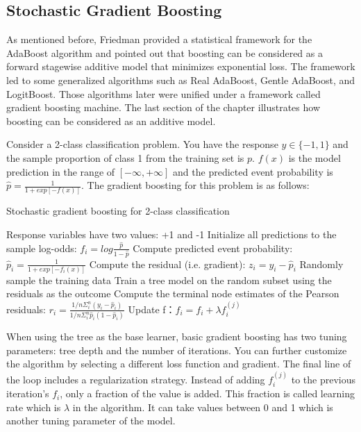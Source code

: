 \documentclass[12pt,]{krantz}
\begin{document}
\hypertarget{stochastic-gradient-boosting}{%
\subsection{Stochastic Gradient Boosting}\label{stochastic-gradient-boosting}}

As mentioned before, Friedman \citep{Friedman2000} provided a statistical framework for the AdaBoost algorithm and pointed out that boosting can be considered as a forward stagewise additive model that minimizes exponential loss. The framework led to some generalized algorithms such as Real AdaBoost, Gentle AdaBoost, and LogitBoost. Those algorithms later were unified under a framework called gradient boosting machine. The last section of the chapter illustrates how boosting can be considered as an additive model.

Consider a 2-class classification problem. You have the response \(y \in \{-1, 1\}\) and the sample proportion of class 1 from the training set is \(p\). \(f(x)\) is the model prediction in the range of \([-\infty, +\infty]\) and the predicted event probability is \(\hat{p}=\frac{1}{1+exp[-f(x)]}\). The gradient boosting for this problem is as follows:

\begin{algorithm}
\caption{Stochastic gradient boosting for 2-class classification}\label{gbmalgorithm} 
\begin{algorithmic}[1] 
\State Response variables have two values: +1 and -1
\State Initialize all  predictions to the sample log-odds: $f_{i} = log \frac{\hat{p}}{1- \hat{p}}$
    \State Compute predicted event probability:  $\hat{p}_i=\frac{1}{1+exp[-f_{i}(x)]}$
    \State Compute the residual (i.e. gradient): $z_i=y_i-\hat{p}_i$
    \State Randomly sample the training data
    \State Train a tree model on the random subset using the residuals as the outcome
    \State Compute the terminal node estimates of the Pearson residuals: $r_i=\frac{1/n\Sigma_i^n(y_i-\hat{p}_i)}{1/n\Sigma_i^n\hat{p}_i(1-\hat{p}_i)}$
    \State Update f：$f_i=f_i+\lambda f_i^{(j)}$
\EndFor
\end{algorithmic}
\end{algorithm}

When using the tree as the base learner, basic gradient boosting has two tuning parameters: tree depth and the number of iterations. You can further customize the algorithm by selecting a different loss function and gradient\citep{Hastie2008}. The final line of the loop includes a regularization strategy. Instead of adding \(f_i^{(j)}\) to the previous iteration's \(f_i\), only a fraction of the value is added. This fraction is called learning rate which is \(\lambda\) in the algorithm. It can take values between 0 and 1 which is another tuning parameter of the model.
\end{document}
